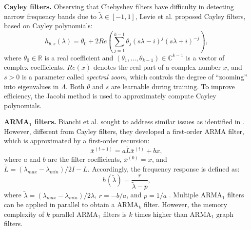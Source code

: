 \documentclass{article}
\begin{document}
\smallskip
\textbf{Cayley filters.  } Observing that Chebyshev filters have difficulty in detecting narrow frequency bands due to $\tilde{\lambda}\in [-1,1]$, Levie et al. \cite{levie2017cayleynets} proposed Cayley filters, based on Cayley polynomials:
\begin{equation} 
h_{\theta,s}(\lambda)=\theta_0+2Re(\sum_{j=1}^{k-1} \theta_j(s\lambda -i)^j(s\lambda+i)^{-j}),
\end{equation} 
where $\theta_0\in\mathbb{R}$ is a real coefficient and $(\theta_1,\dots, \theta_{k-1})\in\mathbb{C}^{k-1}$ is a vector of complex coefficients. $Re(x)$ denotes the real part of a complex number $x$, and $s>0$ is a parameter called \emph{spectral zoom}, which controls the degree of ``zooming'' into eigenvalues in $\Lambda$. Both $\theta$ and $s$ are learnable during training. To improve efficiency, the Jacobi method is used to approximately compute Cayley polynomials. 

\smallskip
\textbf{ARMA$_1$ filters. } Bianchi et al. \cite{bianchi2019graph} sought to address similar issues as identified in \cite{levie2017cayleynets}. However, different from Cayley filters, they developed a first-order ARMA filter, which is approximated by a first-order recursion:
\begin{equation}
\bar{x}^{(t+1)} = a \tilde{L} \bar{x}^{(t)} + b x,
\end{equation}
where $a$ and $b$ are the filter coefficients, $\bar{x}^{(0)} = x$, and $\tilde{L}= (\lambda_{max} - \lambda_{min}) / 2I - L$. Accordingly, the frequency response is defined as:
\begin{equation}
h(\tilde{\lambda}) = \frac{r}{\tilde{\lambda} - p},
\end{equation}
where $\tilde{\lambda} = (\lambda_{max} - \lambda_{min}) / 2 \lambda$, $r = -b/a$, and $p = 1/a$ \cite{isufi2017autoregressive1}. Multiple ARMA$_1$ filters can be applied in parallel to obtain a ARMA$_k$ filter. However, the memory complexity of $k$ parallel ARMA$_1$ filters is $k$ times higher than ARMA$_1$ graph filters. \begin{comment}
\begin{equation}
\bar{X} = \sum_{k=1}^{K} \bar{X}^{k} = \sum_{k=1}^{K} \sum_{m=1}^{M} \frac{r_{k}}{\mu_{m} + p_{k}} u_{m} u_{m}^{T} x_{m},
\end{equation}
where $\sum_{m=1}^{M} h(\mu_{m}) u_{m} u_{m}^{T}$ denotes the spectral decomposition of $L$.
\end{comment}
\end{document}
